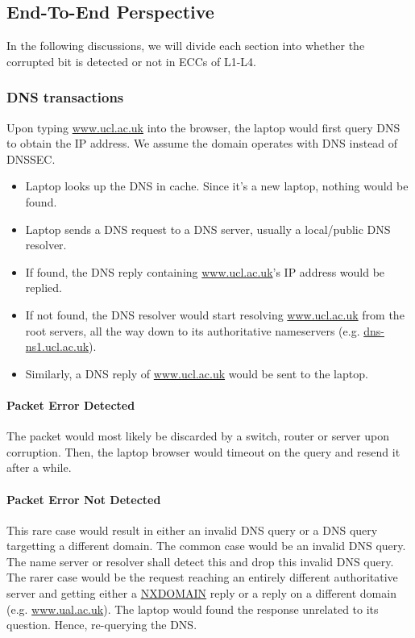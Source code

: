\documentclass[12pt]{article}
\begin{document}
\subsection{End-To-End Perspective}

In the following discussions, we will divide each section into whether the corrupted bit is detected or not in ECCs of L1-L4.

\subsubsection{DNS transactions}

Upon typing \url{www.ucl.ac.uk} into the browser, the laptop would first query DNS to obtain the IP address. We assume the domain operates with DNS instead of DNSSEC.

\begin{itemize}
    \item Laptop looks up the DNS in cache. Since it's a new laptop, nothing would be found.
    \item Laptop sends a DNS request to a DNS server, usually a local/public DNS resolver.
    \item If found, the DNS reply containing \url{www.ucl.ac.uk}'s IP address would be replied.
    \item If not found, the DNS resolver would start resolving \url{www.ucl.ac.uk} from the root servers, all the way down to its authoritative nameservers (e.g. \url{dns-ns1.ucl.ac.uk}).
    \item Similarly, a DNS reply of \url{www.ucl.ac.uk} would be sent to the laptop.
\end{itemize}

\paragraph{Packet Error Detected}

The packet would most likely be discarded by a switch, router or server upon corruption. Then, the laptop browser would timeout on the query and resend it after a while. 

\paragraph{Packet Error Not Detected}

This rare case would result in either an invalid DNS query or a DNS query targetting a different domain. The common case would be an invalid DNS query. The name server or resolver shall detect this and drop this invalid DNS query. The rarer case would be the request reaching an entirely different authoritative server and getting either a \url{NXDOMAIN} reply or a reply on a different domain (e.g. \url{www.ual.ac.uk}). The laptop would found the response unrelated to its question. Hence, re-querying the DNS.
\end{document}
